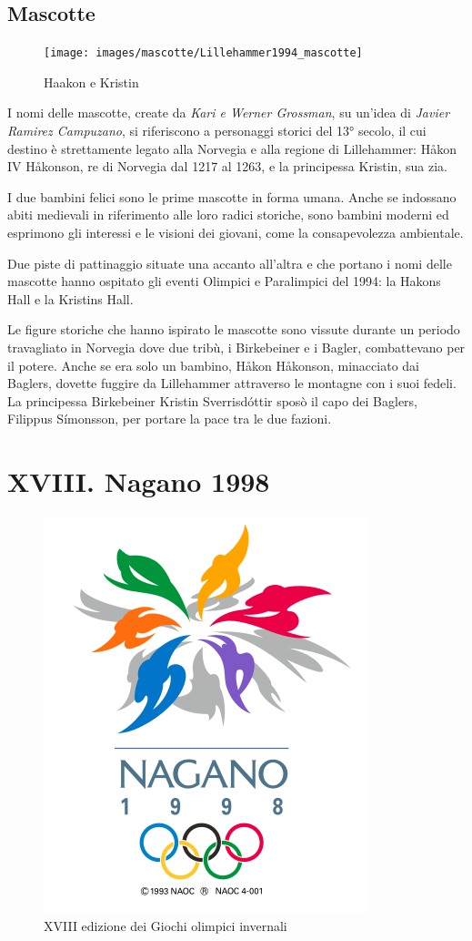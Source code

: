 \documentclass[
]{book}
\begin{document}
\section*{Mascotte}\label{mascotte-6}

\begin{figure}
\texttt{[image: images/mascotte/Lillehammer1994\_mascotte]} \caption{Haakon e Kristin}\label{fig:unnamed-chunk-61}
\end{figure}

I nomi delle mascotte, create da \emph{Kari e Werner Grossman}, su un'idea di \emph{Javier Ramirez Campuzano}, si riferiscono a personaggi storici del 13° secolo, il cui destino è strettamente legato alla Norvegia e alla regione di Lillehammer: Håkon IV Håkonson, re di Norvegia dal 1217 al 1263, e la principessa Kristin, sua zia.

I due bambini felici sono le prime mascotte in forma umana. Anche se indossano abiti medievali in riferimento alle loro radici storiche, sono bambini moderni ed esprimono gli interessi e le visioni dei giovani, come la consapevolezza ambientale.

Due piste di pattinaggio situate una accanto all'altra e che portano i nomi delle mascotte hanno ospitato gli eventi Olimpici e Paralimpici del 1994: la Hakons Hall e la Kristins Hall.

Le figure storiche che hanno ispirato le mascotte sono vissute durante un periodo travagliato in Norvegia dove due tribù, i Birkebeiner e i Bagler, combattevano per il potere. Anche se era solo un bambino, Håkon Håkonson, minacciato dai Baglers, dovette fuggire da Lillehammer attraverso le montagne con i suoi fedeli. La principessa Birkebeiner Kristin Sverrisdóttir sposò il capo dei Baglers, Filippus Símonsson, per portare la pace tra le due fazioni.

\chapter*{XVIII. Nagano 1998}\label{xviii.-nagano-1998}

\begin{figure}
\includegraphics[width=0.4\linewidth]{images/loghi/1998} \caption{XVIII edizione dei Giochi olimpici invernali}\label{fig:unnamed-chunk-62}
\end{figure}
\end{document}
